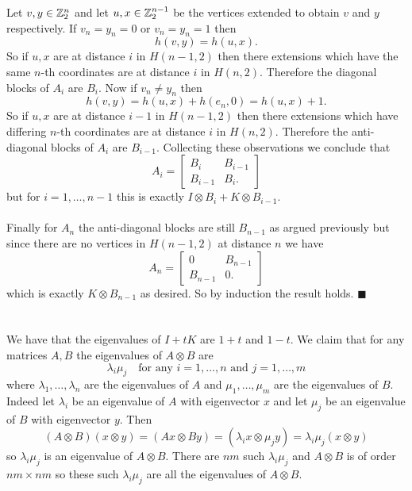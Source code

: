 \documentclass[letterpaper,12pt,oneside,onecolumn]{article}
\newcommand{\1}{\mathbbm{1}}
\begin{document}
Let $v, y \in \mathbb{Z}^n_2$ and let $u, x \in \mathbb{Z}^{n-1}_2$ be the vertices extended to obtain $v$ and $y$ respectively. If $v_n = y_n = 0$ or $v_n = y_n = 1$ then
$$h(v,y) = h(u,x).$$
So if $u,x$ are at distance $i$ in $H(n-1,2)$ then there extensions which have the same $n$-th coordinates are at distance $i$ in $H(n,2)$. Therefore the diagonal blocks of $A_i$ are $B_i$. Now if $v_n \neq y_n$ then
$$h(v,y) = h(u,x) + h(e_n, 0) = h(u,x) + 1.$$
So if $u,x$ are at distance $i-1$ in $H(n-1,2)$ then there extensions which have differing $n$-th coordinates are at distance $i$ in $H(n,2)$. Therefore the anti-diagonal blocks of $A_i$ are $B_{i-1}$. Collecting these observations we conclude that
$$A_i = \begin{bmatrix}B_i & B_{i-1} \\ B_{i-1} & B_i. \end{bmatrix}$$
but for $i = 1,\dots,n-1$ this is exactly $I \otimes B_i + K \otimes B_{i-1}$. 
\paragraph{}
Finally for $A_n$ the anti-diagonal blocks are still $B_{n-1}$ as argued previously but since there are no vertices in $H(n-1,2)$ at distance $n$ we have
$$A_n = \begin{bmatrix}0 & B_{n-1} \\ B_{n-1} & 0. \end{bmatrix}$$
which is exactly $K\otimes B_{n-1}$ as desired. So by induction the result holds. $\blacksquare$
\section{}
\paragraph{}
We have that the eigenvalues of $I+tK$ are $1+t$ and $1-t$. We claim that for any matrices $A, B$ the eigenvalues of $A \otimes B$ are
$$\lambda_i \mu_j \quad \text{for any $i =1,\dots, n$ and $j = 1,\dots,m$}$$ 
where $\lambda_1, \dots, \lambda_n$ are the eigenvalues of $A$ and $\mu_1, \dots, \mu_m$ are the eigenvalues of $B$. Indeed let $\lambda_i$ be an eigenvalue of $A$ with eigenvector $x$ and let $\mu_j$ be an eigenvalue of $B$ with eigenvector $y$. Then 
$$(A\otimes B)(x\otimes y) = (Ax \otimes By) = (\lambda_i x \otimes \mu_j y) = \lambda_i\mu_j(x\otimes y)$$
so $\lambda_i \mu_j$ is an eigenvalue of $A\otimes B$. There are $nm$ such $\lambda_i\mu_j$ and $A \otimes B$ is of order $nm \times nm$ so these such $\lambda_i \mu_j$ are all the eigenvalues of $A\otimes B$.
\end{document}
